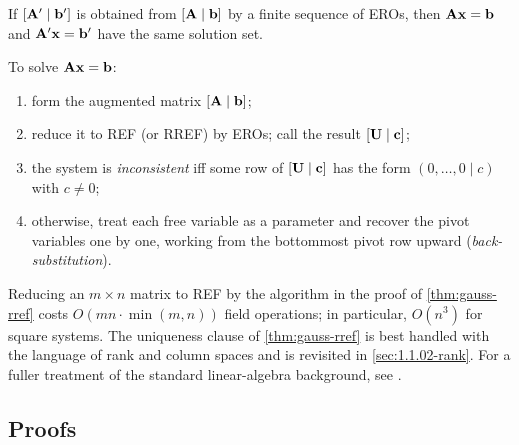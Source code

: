 \begin{theorem}
\label{thm:gauss-invariance}
If $[\mathbf{A}' \mid \mathbf{b}']$ is obtained from $[\mathbf{A} \mid \mathbf{b}]$
by a finite sequence of EROs, then $\mathbf{A}\mathbf{x} = \mathbf{b}$ and
$\mathbf{A}'\mathbf{x} = \mathbf{b}'$ have the same solution set.
\end{theorem}

\begin{corollary}
\label{cor:gauss-solving}
To solve $\mathbf{A}\mathbf{x} = \mathbf{b}$:
\begin{enumerate}
  \item form the augmented matrix $[\mathbf{A} \mid \mathbf{b}]$;
  \item reduce it to REF (or RREF) by EROs; call the result
        $[\mathbf{U} \mid \mathbf{c}]$;
  \item the system is \emph{inconsistent} iff some row of $[\mathbf{U} \mid \mathbf{c}]$
        has the form $(0, \dots, 0 \mid c)$ with $c \neq 0$;
  \item otherwise, treat each free variable as a parameter and recover
        the pivot variables one by one, working from the bottommost
        pivot row upward (\emph{back-substitution}).
\end{enumerate}
\end{corollary}

\begin{remark}
\label{rem:gauss-complexity}
Reducing an $m \times n$ matrix to REF by the algorithm in the proof of
\cref{thm:gauss-rref} costs $O(mn \cdot \min(m, n))$ field operations;
in particular, $O(n^3)$ for square systems. The uniqueness clause of
\cref{thm:gauss-rref} is best handled with the language of rank and
column spaces and is revisited in \cref{sec:1.1.02-rank}. For a
fuller treatment of the standard linear-algebra background, see
\cite{Beklemishev2025}.
\end{remark}

\subsection*{Proofs}

